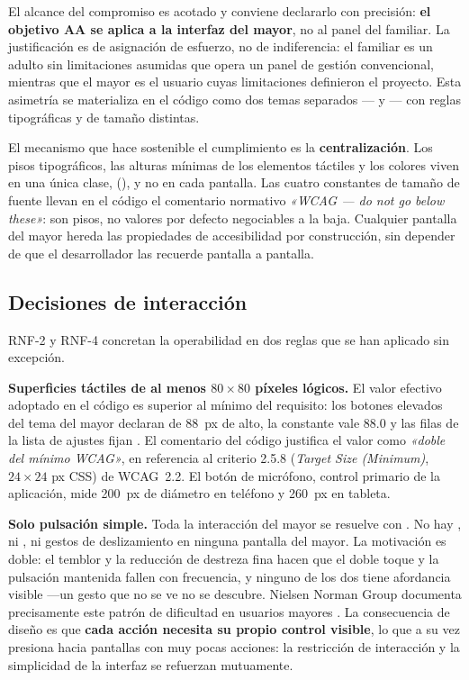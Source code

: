 El alcance del compromiso es acotado y conviene declararlo con precisión: \textbf{el objetivo AA se
aplica a la interfaz del mayor}, no al panel del familiar. La justificación es de asignación de esfuerzo,
no de indiferencia: el familiar es un adulto sin limitaciones asumidas que opera un panel de gestión
convencional, mientras que el mayor es el usuario cuyas limitaciones definieron el proyecto. Esta
asimetría se materializa en el código como dos temas separados --- y
--- con reglas tipográficas y de tamaño distintas.

El mecanismo que hace sostenible el cumplimiento es la \textbf{centralización}. Los pisos tipográficos, las
alturas mínimas de los elementos táctiles y los colores viven en una única clase, 
(), y no en cada pantalla. Las cuatro constantes de tamaño de fuente
llevan en el código el comentario normativo \emph{«WCAG --- do not go below these»}: son pisos, no valores
por defecto negociables a la baja. Cualquier pantalla del mayor hereda las propiedades de accesibilidad por
construcción, sin depender de que el desarrollador las recuerde pantalla a pantalla.

\subsection{Decisiones de interacción}

RNF-2 y RNF-4 concretan la operabilidad en dos reglas que se han aplicado sin excepción.

\textbf{Superficies táctiles de al menos $80\times80$ píxeles lógicos.} El valor efectivo adoptado en el
código es superior al mínimo del requisito: los botones elevados del tema del mayor declaran
 de 88~px de alto, la constante  vale 88.0 y las filas de
la lista de ajustes fijan . El comentario del código justifica el valor como
\emph{«doble del mínimo WCAG»}, en referencia al criterio 2.5.8 (\emph{Target Size (Minimum)}, $24\times24$
px CSS) de WCAG~2.2. El botón de micrófono, control primario de la aplicación, mide 200~px de diámetro en
teléfono y 260~px en tableta.

\textbf{Solo pulsación simple.} Toda la interacción del mayor se resuelve con . No hay
, ni , ni gestos de deslizamiento en ninguna pantalla del mayor. La
motivación es doble: el temblor y la reducción de destreza fina hacen que el doble toque y la pulsación
mantenida fallen con frecuencia, y ninguno de los dos tiene afordancia visible ---un gesto que no se ve no
se descubre. Nielsen Norman Group documenta precisamente este patrón de dificultad en usuarios mayores
\autocite{Kane2019}. La consecuencia de diseño es que \textbf{cada acción necesita su propio control
visible}, lo que a su vez presiona hacia pantallas con muy pocas acciones: la restricción de interacción y
la simplicidad de la interfaz se refuerzan mutuamente.

